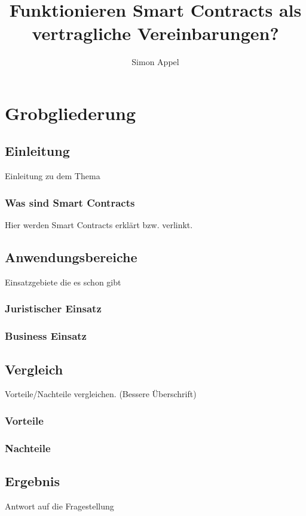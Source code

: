 \documentclass[]{protocol}
\title{Funktionieren Smart Contracts als vertragliche Vereinbarungen?}
\author{Simon Appel}
\begin{document}

\section{Grobgliederung}
\subsection{Einleitung}
Einleitung zu dem Thema
\subsubsection{Was sind Smart Contracts}
Hier werden Smart Contracts erklärt bzw. verlinkt. 
\subsection{Anwendungsbereiche}
Einsatzgebiete die es schon gibt
\subsubsection{Juristischer Einsatz}
\subsubsection{Business Einsatz}
\subsection{Vergleich}
Vorteile/Nachteile vergleichen. (Bessere Überschrift)
\subsubsection{Vorteile}
\subsubsection{Nachteile}
\subsection{Ergebnis}
Antwort auf die Fragestellung
\end{document}
